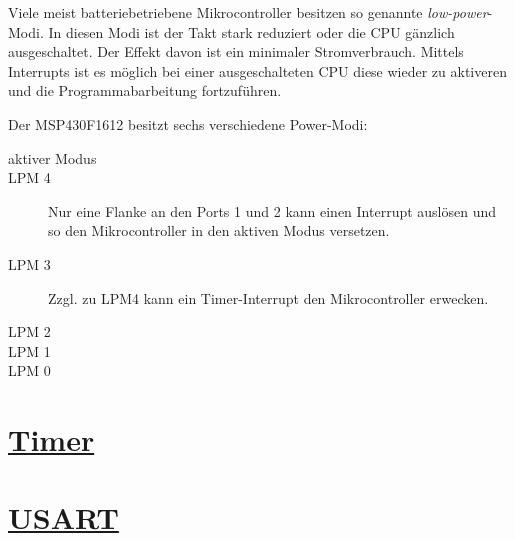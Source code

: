 \documentclass[11pt,german]{scrartcl}
\begin{document}
Viele meist batteriebetriebene Mikrocontroller besitzen so genannte \emph{low-power}-Modi.
In diesen Modi ist der Takt stark reduziert oder die CPU gänzlich ausgeschaltet. Der Effekt davon ist ein minimaler Stromverbrauch.
Mittels Interrupts ist es möglich bei einer ausgeschalteten CPU diese wieder zu aktiveren und die Programmabarbeitung fortzuführen.

Der MSP430F1612 besitzt sechs verschiedene Power-Modi:
\begin{description}
    \item [aktiver Modus]
    \item [LPM 4]  Nur eine Flanke an den Ports 1 und 2 kann einen Interrupt auslösen und so den Mikrocontroller in den aktiven Modus versetzen.
    \item [LPM 3] Zzgl. zu LPM4 kann ein Timer-Interrupt den Mikrocontroller erwecken.
    \item [LPM 2]
    \item [LPM 1]
    \item [LPM 0]
\end{description}






\clearpage
\section*
{\href{http://cst.mi.fu-berlin.de/intern/19606-P-MPP/Aufgaben/040600.html}
{Timer}}






\clearpage
\section*
{\href{http://cst.mi.fu-berlin.de/intern/19606-P-MPP/Aufgaben/040700.html}
{USART}}




\end{document}
